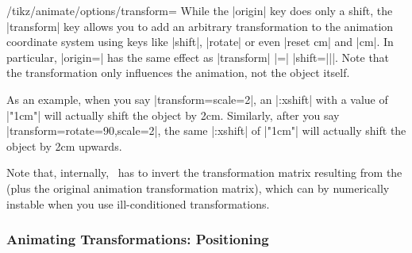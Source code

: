 \begin{key}{/tikz/animate/options/transform=}
    While the |origin| key does only a shift, the |transform| key allows you to
    add an arbitrary transformation to the animation coordinate system using
    keys like |shift|, |rotate| or even |reset cm| and |cm|. In particular,
    |origin=| has the same effect as |transform| |=|
    |{shift=||}|. Note that the transformation only influences the
    animation, not the object itself.

    As an example, when you say |transform={scale=2}|, an |:xshift| with a
    value of |"1cm"| will actually shift the object by 2cm. Similarly, after
    you say |transform={rotate=90,scale=2}|, the same |:xshift| of |"1cm"| will
    actually shift the object by 2cm upwards.

    Note that, internally, \tikzname\ has to invert the transformation matrix
    resulting from the  (plus the original animation
    transformation matrix), which can by numerically instable when you use
    ill-conditioned transformations.
\begin{codeexample}[
    preamble={\usetikzlibrary{animations}},
    animation list={0.5,1,1.5,2},
]
\end{codeexample}
\begin{codeexample}[
    preamble={\usetikzlibrary{animations}},
    animation list={0.5,1,1.5,2},
]
\end{codeexample}
\end{key}


\subsubsection{Animating Transformations: Positioning}

